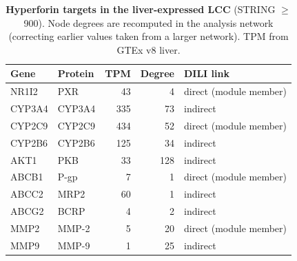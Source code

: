 \begin{table}[ht]
\centering
\caption{\textbf{Hyperforin targets in the liver-expressed LCC} (STRING $\geq$900). Node degrees are recomputed in the analysis network (correcting earlier values taken from a larger network). TPM from GTEx v8 liver.}
\label{tab:s_hyptargets}
\begin{tabular}{@{}llrrl@{}}
\toprule
\textbf{Gene} & \textbf{Protein} & \textbf{TPM} & \textbf{Degree} & \textbf{DILI link} \\
\midrule
NR1I2  & PXR         & 43  & 4   & direct (module member) \\
CYP3A4 & CYP3A4      & 335 & 73  & indirect \\
CYP2C9 & CYP2C9      & 434 & 52  & direct (module member) \\
CYP2B6 & CYP2B6      & 125 & 34  & indirect \\
AKT1   & PKB         & 33  & 128 & indirect \\
ABCB1  & P-gp        & 7   & 1   & direct (module member) \\
ABCC2  & MRP2        & 60  & 1   & indirect \\
ABCG2  & BCRP        & 4   & 2   & indirect \\
MMP2   & MMP-2       & 5   & 20  & direct (module member) \\
MMP9   & MMP-9       & 1   & 25  & indirect \\
\bottomrule
\end{tabular}
\end{table}


